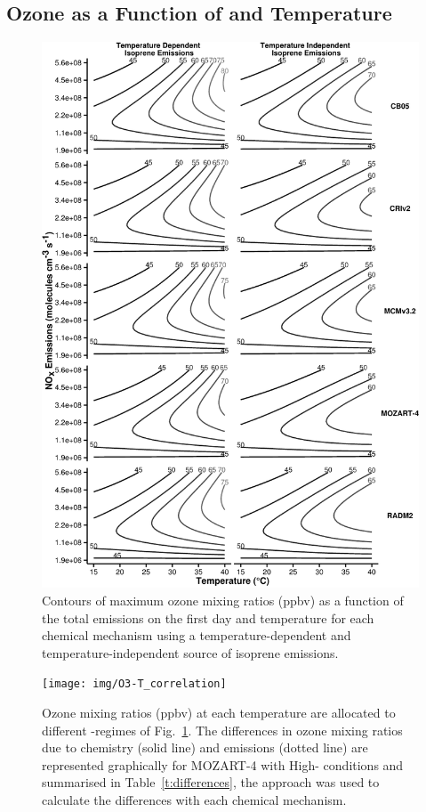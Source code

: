 \subsection[Ozone as a Function of NOx and Temperature]{Ozone as a Function of  and Temperature} \label{ss:r_contours} 
\begin{figure}%
    \centering%
    \caption{Contours of maximum ozone mixing ratios (ppbv) as a function of the total  emissions on the first day and temperature for each chemical mechanism using a temperature-dependent and temperature-independent source of isoprene emissions.}
    \label{f:ozone_contours}%
    \includegraphics[width=\textwidth]{img/O3_comparison}%
\end{figure}

\begin{figure}[t]%
    \centering%
    \caption{Ozone mixing ratios (ppbv) at each temperature are allocated to different -regimes of Fig.~\ref{f:ozone_contours}. The differences in ozone mixing ratios due to chemistry (solid line) and emissions (dotted line) are represented graphically for MOZART-4 with High- conditions and summarised in Table~\ref{t:differences}, the approach was used to calculate the differences with each chemical mechanism.}%
    \label{f:O3-T}%
    \texttt{[image: img/O3-T\_correlation]}%
\end{figure}

